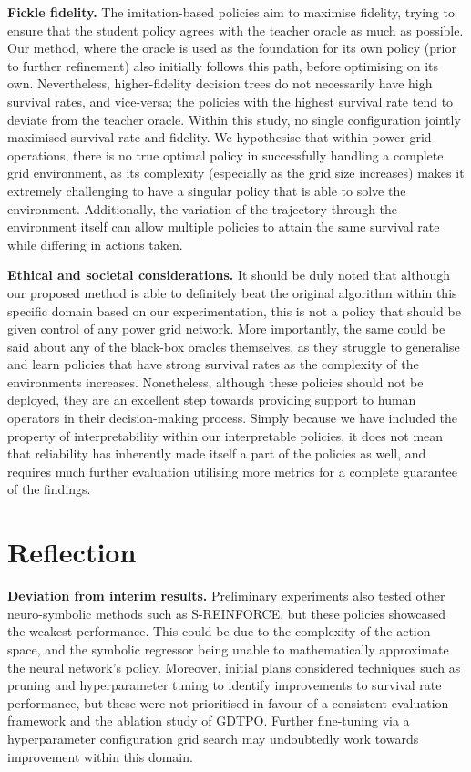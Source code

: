 \textbf{Fickle fidelity.} The imitation-based policies aim to maximise fidelity, trying to ensure that the student policy agrees with the teacher oracle as much as possible. Our method, where the oracle is used as the foundation for its own policy (prior to further refinement) also initially follows this path, before optimising on its own. Nevertheless, higher-fidelity decision trees do not necessarily have high survival rates, and vice-versa; the policies with the highest survival rate tend to deviate from the teacher oracle. Within this study, no single configuration jointly maximised survival rate and fidelity. We hypothesise that within power grid operations, there is no true optimal policy in successfully handling a complete grid environment, as its complexity (especially as the grid size increases) makes it extremely challenging to have a singular policy that is able to solve the environment. Additionally, the variation of the trajectory through the environment itself can allow multiple policies to attain the same survival rate while differing in actions taken.


\textbf{Ethical and societal considerations.} \label{sec:discussion} It should be duly noted that although our proposed method is able to definitely beat the original algorithm within this specific domain based on our experimentation, this is not a policy that should be given control of any power grid network. More importantly, the same could be said about any of the black-box oracles themselves, as they struggle to generalise and learn policies that have strong survival rates as the complexity of the environments increases. Nonetheless, although these policies should not be deployed, they are an excellent step towards providing support to human operators in their decision-making process. Simply because we have included the property of interpretability within our interpretable policies, it does not mean that reliability has inherently made itself a part of the policies as well, and requires much further evaluation utilising more metrics for a complete guarantee of the findings. 

\section{Reflection}

\textbf{Deviation from interim results.} Preliminary experiments also tested other neuro-symbolic methods such as S-REINFORCE, but these policies showcased the weakest performance. This could be due to the complexity of the action space, and the symbolic regressor being unable to mathematically approximate the neural network's policy. Moreover, initial plans considered techniques such as pruning and hyperparameter tuning to identify improvements to survival rate performance, but these were not prioritised in favour of a consistent evaluation framework and the ablation study of GDTPO. Further fine-tuning via a hyperparameter configuration grid search may undoubtedly work towards improvement within this domain.  


